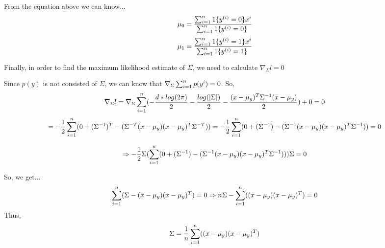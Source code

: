 \begin{answer}
 From the equation above we can know...
 \begin{equation*}
     \mu_0 = \frac{\sum_{i=1}^{n} 1\{y^{(i)} = 0\} \\x^{i}}{\sum_{i=1}^{n} 1\{y^{(i)} = 0\} \\} 
 \end{equation*}
 \begin{equation*}
     \mu_1 = \frac{\sum_{i=1}^{n} 1\{y^{(i)} = 1\} \\x^{i}}{\sum_{i=1}^{n} 1\{y^{(i)} = 1\} \\} 
 \end{equation*}
 
 Finally, in order to find the maximum likelihood estimate of $\Sigma$, we need to calculate $\nabla_\Sigma l = 0$
 
 Since $p(y)$ is not consisted of $\Sigma$, we can know that $\nabla_\Sigma\sum_{i=1}^{n} p(y^{i}) = 0$.
 So, 
 \begin{equation*}
     \nabla_\Sigma l = \nabla_\Sigma\sum_{i=1}^{n}(-\frac{d*log(2\pi)}{2} -\frac{log(|\Sigma|)}{2} -\frac{(x-\mu_y)^{T}\Sigma^{-1}(x-\mu_y)}{2}) +0 = 0
 \end{equation*}
 \begin{equation*}
     = -\frac{1}{2}\sum_{i=1}^{n}(0 + (\Sigma^{-1})^{T} - (\Sigma^{-T}(x-\mu_y)(x-\mu_y)^{T}\Sigma^{-T}))
     = -\frac{1}{2}\sum_{i=1}^{n}(0 + (\Sigma^{-1}) - (\Sigma^{-1}(x-\mu_y)(x-\mu_y)^{T}\Sigma^{-1})) = 0
 \end{equation*}
 
 
 \begin{equation*}
     \Rightarrow -\frac{1}{2}\Sigma(\sum_{i=1}^{n}(0 + (\Sigma^{-1}) - (\Sigma^{-1}(x-\mu_y)(x-\mu_y)^{T}\Sigma^{-1})))\Sigma = 0
 \end{equation*}
 
 So, we get...
 \begin{equation*}
     \sum_{i=1}^{n} (\Sigma - (x-\mu_y)(x-\mu_y)^{T}) = 0 \Rightarrow
     n\Sigma -  \sum_{i=1}^{n} ((x-\mu_y)(x-\mu_y)^{T}) = 0
 \end{equation*}
 Thus, 
 \begin{equation*}
     \Sigma = \frac{1}{n}\sum_{i=1}^{n} ((x-\mu_y)(x-\mu_y)^{T})
 \end{equation*}
\end{answer}
